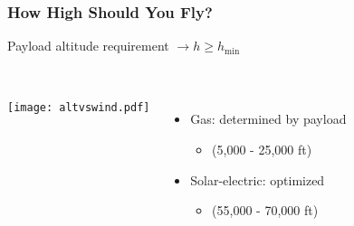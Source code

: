 \documentclass{beamer}
\begin{document}
\begin{frame}
    \frametitle{How High Should You Fly?}

    \pause
    Payload altitude requirement $\rightarrow h \geq h_{\text{min}}$ \\~\\

    \pause
    \begin{columns}
        \texttt{[image: altvswind.pdf]}

        \pause
        
        \begin{itemize}
            \item Gas: determined by payload
                \begin{itemize}
                    \item (5,000 - 25,000 ft)
                    \end{itemize}
                    \pause
            \item Solar-electric: optimized 
                \begin{itemize}
                    \item (55,000 - 70,000 ft)
                    \end{itemize}
                \end{itemize}
        
    \end{columns}

\end{frame}
\end{document}
